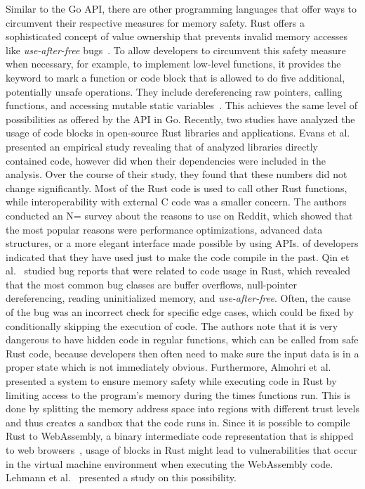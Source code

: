 Similar to the Go \unsafe{} \acrshort{API}, there are other programming languages that offer ways to circumvent their
respective measures for memory safety.
Rust offers a sophisticated concept of value ownership that prevents invalid memory accesses like
\textit{use-after-free} bugs~\cite{matsakis2014}.
To allow developers to circumvent this safety measure when necessary, for example, to implement low-level functions, it
provides the \unsafe{} keyword to mark a function or code block that is allowed to do five additional, potentially
unsafe operations.
They include dereferencing raw pointers, calling \unsafe{} functions, and accessing mutable static
variables~\cite{matsakis2014}.
This achieves the same level of possibilities as offered by the \unsafe{} \acrshort{API} in Go.
Recently, two studies have analyzed the usage of \unsafe{} code blocks in open-source Rust libraries and applications.
Evans et al.~\cite{evans2020} presented an empirical study revealing that  of analyzed
libraries directly contained \unsafe{} code, however  did when their dependencies were included
in the analysis.
Over the course of their  study, they found that these numbers did not change significantly.
Most of the \unsafe{} Rust code is used to call other Rust functions, while interoperability with external C code was a
smaller concern.
The authors conducted an N= survey about the reasons to use \unsafe{} on Reddit, which showed that the most
popular reasons were performance optimizations, advanced data structures, or a more elegant interface made possible by
using \unsafe{} \acrshort{API}s.
 of developers indicated that they have used \unsafe{} just to make the code compile in the past.
Qin et al.~\cite{qin2020} studied bug reports that were related to \unsafe{} code usage in Rust, which revealed that the
most common bug classes are buffer overflows, null-pointer dereferencing, reading uninitialized memory, and
\textit{use-after-free}.
Often, the cause of the bug was an incorrect check for specific edge cases, which could be fixed by conditionally
skipping the execution of \unsafe{} code.
The authors note that it is very dangerous to have hidden \unsafe{} code in regular functions, which can be called from
safe Rust code, because developers then often need to make sure the input data is in a proper state which is not
immediately obvious.
Furthermore, Almohri et al.~\cite{almohri2018} presented a system to ensure memory safety while executing \unsafe{} code
in Rust by limiting access to the program's memory during the times \unsafe{} functions run.
This is done by splitting the memory address space into regions with different trust levels and thus creates a sandbox
that the \unsafe{} code runs in.
Since it is possible to compile Rust to WebAssembly, a binary intermediate code representation that is shipped to web
browsers~\cite{rourke2018}, usage of \unsafe{} blocks in Rust might lead to vulnerabilities that occur in the virtual
machine environment when executing the WebAssembly code.
Lehmann et al.~\cite{lehmann2020} presented a study on this possibility.

